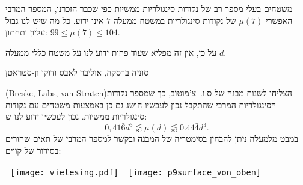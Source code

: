 \begin{surferPage}{%
משטחים בעלי מספר רב של נקודות סינגולריות ממשיות%
}
    כפי שכבר הזכרנו, המספר המרבי האפשרי
    $\mu(7)$ של נקודות סינגולריות במשטח ממעלה $7$ אינו ידוע.
    כל מה שיש לנו גבול עליון ותחתון: $99\le \mu(7) \le 104$.


    על כן, אין זה מפליא שעוד פחות ידוע לנו על משטח כללי ממעלה $d$.

    סוניה ברסקה, אוליבר לאבס ודוקו ון-סטראטן

    \textenglish{ (Breske, Labs, van-Straten)}הצליחו לשנות
    מבנה של ס.ו.\  צ'מוּטוֹב, כך שמספר נקודות הסינגולריות
    המרבי שהתקבל נכון לעכשיו הושג גם כן באמצעות משטחים עם
    נקודות סינגולריות ממשיות.
    נכון לעכשיו ידוע לנו ש:
    \[0,41\bar{6}d^3 \lessapprox \mu(d) \lessapprox 0.44\bar{4} d^3.\]
     במבט מלמעלה ניתן להבחין בסימטריה של המבנה ובקשר
    למספר המרבי של תאים שחורים בסידור של קווים:
    \begin{center}
      \begin{tabular}{c@{\qquad}c}
        \texttt{[image: vielesing.pdf]}
        &
        \texttt{[image: p9surface\_von\_oben]}
      \end{tabular}
    \end{center}
\end{surferPage}
